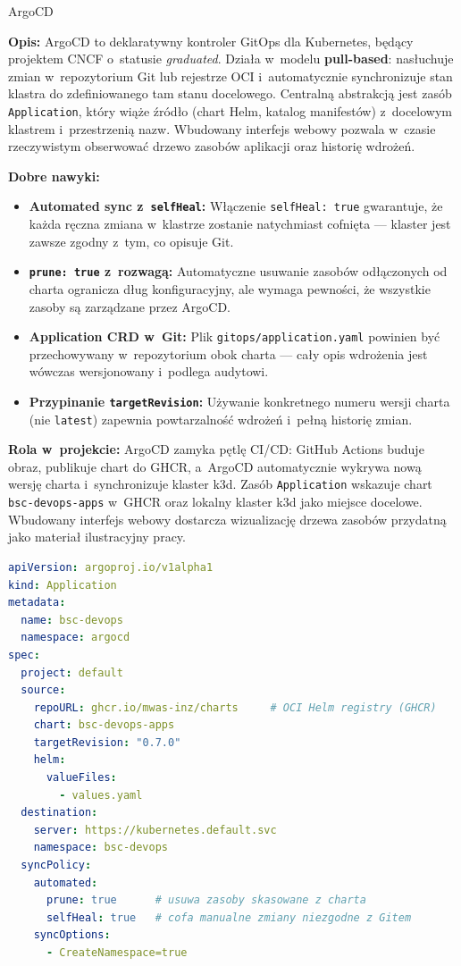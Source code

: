 \begin{techcard}{ArgoCD}

\textbf{Opis:} ArgoCD to deklaratywny kontroler GitOps dla Kubernetes, będący projektem CNCF o~statusie \textit{graduated}. Działa w~modelu \textbf{pull-based}: nasłuchuje zmian w~repozytorium Git lub rejestrze OCI i~automatycznie synchronizuje stan klastra do zdefiniowanego tam stanu docelowego. Centralną abstrakcją jest zasób \texttt{Application}, który wiąże źródło (chart Helm, katalog manifestów) z~docelowym klastrem i~przestrzenią nazw. Wbudowany interfejs webowy pozwala w~czasie rzeczywistym obserwować drzewo zasobów aplikacji oraz historię wdrożeń.

\textbf{Dobre nawyki:}
\begin{itemize}
  \item \textbf{Automated sync z~\texttt{selfHeal}:} Włączenie \texttt{selfHeal: true} gwarantuje, że każda ręczna zmiana w~klastrze zostanie natychmiast cofnięta --- klaster jest zawsze zgodny z~tym, co opisuje Git.
  \item \textbf{\texttt{prune: true} z~rozwagą:} Automatyczne usuwanie zasobów odłączonych od charta ogranicza dług konfiguracyjny, ale wymaga pewności, że wszystkie zasoby są zarządzane przez ArgoCD.
  \item \textbf{Application CRD w~Git:} Plik \texttt{gitops/application.yaml} powinien być przechowywany w~repozytorium obok charta --- cały opis wdrożenia jest wówczas wersjonowany i~podlega audytowi.
  \item \textbf{Przypinanie \texttt{targetRevision}:} Używanie konkretnego numeru wersji charta (nie \texttt{latest}) zapewnia powtarzalność wdrożeń i~pełną historię zmian.
\end{itemize}

\textbf{Rola w~projekcie:} ArgoCD zamyka pętlę CI/CD: GitHub Actions buduje obraz, publikuje chart do GHCR, a~ArgoCD automatycznie wykrywa nową wersję charta i~synchronizuje klaster k3d. Zasób \texttt{Application} wskazuje chart \texttt{bsc-devops-apps} w~GHCR oraz lokalny klaster k3d jako miejsce docelowe. Wbudowany interfejs webowy dostarcza wizualizację drzewa zasobów przydatną jako materiał ilustracyjny pracy.

\end{techcard}

\begin{lstlisting}[language=yaml, caption={ArgoCD Application CRD --- deklaracja wdrożenia charta \texttt{bsc-devops} z~GHCR do klastra k3d (gitops/application.yaml)}, label={lst:argocd-application}]
apiVersion: argoproj.io/v1alpha1
kind: Application
metadata:
  name: bsc-devops
  namespace: argocd
spec:
  project: default
  source:
    repoURL: ghcr.io/mwas-inz/charts     # OCI Helm registry (GHCR)
    chart: bsc-devops-apps
    targetRevision: "0.7.0"
    helm:
      valueFiles:
        - values.yaml
  destination:
    server: https://kubernetes.default.svc
    namespace: bsc-devops
  syncPolicy:
    automated:
      prune: true      # usuwa zasoby skasowane z charta
      selfHeal: true   # cofa manualne zmiany niezgodne z Gitem
    syncOptions:
      - CreateNamespace=true
\end{lstlisting}

